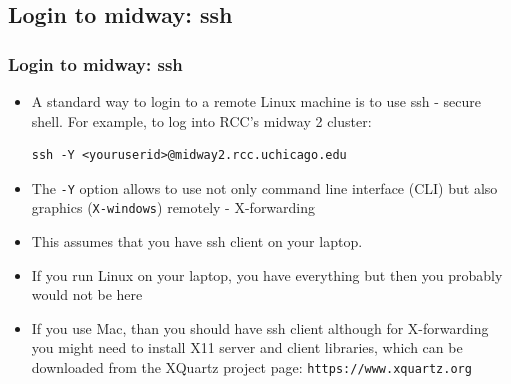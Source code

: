 \documentclass{beamer}
\begin{document}
\subsection{Login to midway: ssh}
\begin{frame}[fragile]
  \frametitle{Login to midway: ssh}
  \begin{itemize}
  \item A standard way to login to a remote Linux machine is to use {\color{mycolorcli}ssh} - {\color{mycolordef}s}ecure {\color{mycolordef}sh}ell. For example, to log into RCC's midway 2 cluster:
{\color{mycolorcli}
\begin{verbatim}
ssh -Y <youruserid>@midway2.rcc.uchicago.edu
\end{verbatim}
}
  \item The {\color{mycolorcli}\verb|-Y|} option allows to use not only command line interface (CLI) but also graphics (\verb|X-windows|) remotely - {\color{mycolordef}X-forwarding}
  \item This assumes that you have ssh client on your laptop.
  \item If you run Linux on your laptop, you have everything but then you probably would not be here
  \item If you use Mac, than you should have ssh client although for X-forwarding you might need to install X11 server and client libraries, 
    which can be downloaded from the XQuartz project page: {\color{mycolorcli}\verb|https://www.xquartz.org|}
  \end{itemize}
\end{frame}
\end{document}
